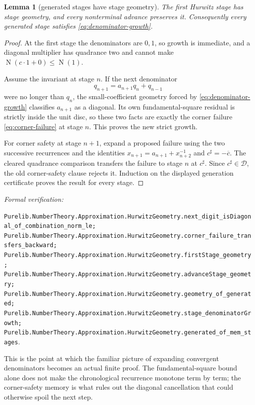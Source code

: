 \documentclass[11pt]{article}
\newtheorem{lemma}[lemma]{Lemma}
\newcommand{\Norm}[1]{\operatorname{N}\!\left(#1\right)}
\newcommand{\leanref}[1]{\par\smallskip\noindent
  \emph{Formal verification:}\par\nobreak
  {\raggedright\nolinkurl{#1}.\par}}
\begin{document}
\begin{lemma}[generated stages have stage geometry]
\label{lem:generated-stage-geometry}
The first Hurwitz stage has stage geometry, and every nonterminal advance
preserves it.  Consequently every generated stage satisfies
\eqref{eq:denominator-growth}.
\end{lemma}

\begin{proof}
At the first stage the denominators are $0,1$, so growth is immediate, and a
diagonal multiplier has quadrance two and cannot make
$\Norm{c\cdot1+0}\le\Norm1$.

Assume the invariant at stage $n$.  If the next denominator
\[
                         q_{n+1}=a_{n+1}q_n+q_{n-1}
\]
were no longer than $q_n$, the small-coefficient geometry forced by
\eqref{eq:denominator-growth} classifies $a_{n+1}$ as a diagonal.  Its own
fundamental-square residual is strictly inside the unit disc, so these two
facts are exactly the corner failure \eqref{eq:corner-failure} at stage $n$.
This proves the new strict growth.

For corner safety at stage $n+1$, expand a proposed failure using the two
successive recurrences and the identities
$x_{n+1}=a_{n+1}+x_{n+2}^{-1}$ and
$c^\sharp=-\overline c$.  The cleared quadrance comparison transfers the
failure to stage $n$ at $c^\sharp$.  Since
$c^\sharp\in\mathcal D$, the old corner-safety clause rejects it.  Induction
on the displayed generation certificate proves the result for every stage.
\end{proof}

\leanref{Purelib.NumberTheory.Approximation.HurwitzGeometry.next_digit_isDiagonal_of_combination_norm_le;
Purelib.NumberTheory.Approximation.HurwitzGeometry.corner_failure_transfers_backward;
Purelib.NumberTheory.Approximation.HurwitzGeometry.firstStage_geometry;
Purelib.NumberTheory.Approximation.HurwitzGeometry.advanceStage_geometry;
Purelib.NumberTheory.Approximation.HurwitzGeometry.geometry_of_generated;
Purelib.NumberTheory.Approximation.HurwitzGeometry.stage_denominatorGrowth;
Purelib.NumberTheory.Approximation.HurwitzGeometry.generated_of_mem_stages}

This is the point at which the familiar picture of expanding convergent
denominators becomes an actual finite proof.  The fundamental-square bound
alone does not make the chronological recurrence monotone term by term;
the corner-safety memory is what rules out the diagonal cancellation that
could otherwise spoil the next step.
\end{document}
